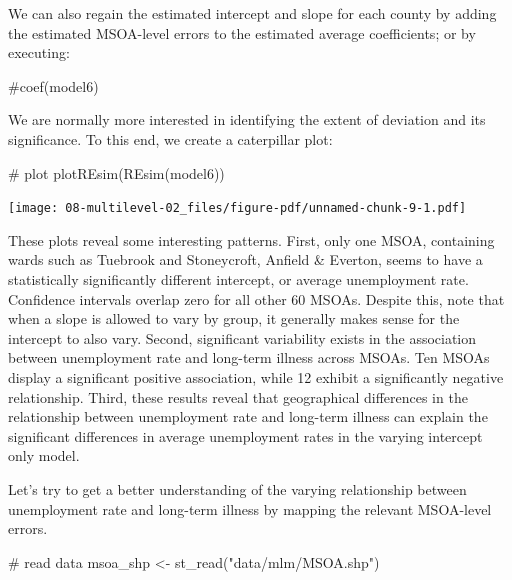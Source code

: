 \documentclass[
  letterpaper,
  DIV=11,
  numbers=noendperiod,
  oneside]{scrreprt}
\newenvironment{Shaded}{\begin{snugshade}}{\end{snugshade}}
\newcommand{\CommentTok}[1]{\textcolor[rgb]{0.37,0.37,0.37}{#1}}
\newcommand{\FunctionTok}[1]{\textcolor[rgb]{0.28,0.35,0.67}{#1}}
\newcommand{\NormalTok}[1]{\textcolor[rgb]{0.00,0.23,0.31}{#1}}
\newcommand{\OtherTok}[1]{\textcolor[rgb]{0.00,0.23,0.31}{#1}}
\newcommand{\StringTok}[1]{\textcolor[rgb]{0.13,0.47,0.30}{#1}}
\begin{document}
We can also regain the estimated intercept and slope for each county by
adding the estimated MSOA-level errors to the estimated average
coefficients; or by executing:

\begin{Shaded}
\begin{Highlighting}[]
\CommentTok{\#coef(model6)}
\end{Highlighting}
\end{Shaded}

We are normally more interested in identifying the extent of deviation
and its significance. To this end, we create a caterpillar plot:

\begin{Shaded}
\begin{Highlighting}[]
\CommentTok{\# plot}
\FunctionTok{plotREsim}\NormalTok{(}\FunctionTok{REsim}\NormalTok{(model6))}
\end{Highlighting}
\end{Shaded}

\texttt{[image: 08-multilevel-02\_files/figure-pdf/unnamed-chunk-9-1.pdf]}

These plots reveal some interesting patterns. First, only one MSOA,
containing wards such as Tuebrook and Stoneycroft, Anfield \& Everton,
seems to have a statistically significantly different intercept, or
average unemployment rate. Confidence intervals overlap zero for all
other 60 MSOAs. Despite this, note that when a slope is allowed to vary
by group, it generally makes sense for the intercept to also vary.
Second, significant variability exists in the association between
unemployment rate and long-term illness across MSOAs. Ten MSOAs display
a significant positive association, while 12 exhibit a significantly
negative relationship. Third, these results reveal that geographical
differences in the relationship between unemployment rate and long-term
illness can explain the significant differences in average unemployment
rates in the varying intercept only model.

Let's try to get a better understanding of the varying relationship
between unemployment rate and long-term illness by mapping the relevant
MSOA-level errors.

\begin{Shaded}
\begin{Highlighting}[]
\CommentTok{\# read data}
\NormalTok{msoa\_shp }\OtherTok{\textless{}{-}} \FunctionTok{st\_read}\NormalTok{(}\StringTok{"data/mlm/MSOA.shp"}\NormalTok{)}
\end{Highlighting}
\end{Shaded}
\end{document}
